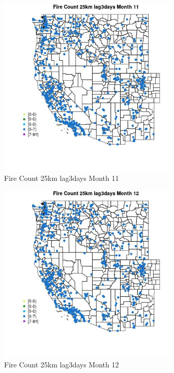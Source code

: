 \begin{figure} 
\centering  
\includegraphics[width=0.77\textwidth]{Code_Outputs/Report_ML_input_PM25_Step4_part_e_de_duplicated_aves_compiled_2019-05-21wNAs_MapObsMo11Fire_Count_25km_lag3days.jpg} 
\caption{\label{fig:Report_ML_input_PM25_Step4_part_e_de_duplicated_aves_compiled_2019-05-21wNAsMapObsMo11Fire_Count_25km_lag3days}Fire Count 25km lag3days Month 11} 
\end{figure} 
 

\begin{figure} 
\centering  
\includegraphics[width=0.77\textwidth]{Code_Outputs/Report_ML_input_PM25_Step4_part_e_de_duplicated_aves_compiled_2019-05-21wNAs_MapObsMo12Fire_Count_25km_lag3days.jpg} 
\caption{\label{fig:Report_ML_input_PM25_Step4_part_e_de_duplicated_aves_compiled_2019-05-21wNAsMapObsMo12Fire_Count_25km_lag3days}Fire Count 25km lag3days Month 12} 
\end{figure} 
 

